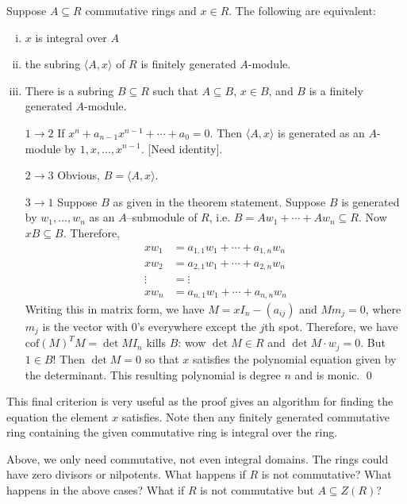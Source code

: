 \begin{thm}
Suppose $A \subseteq R$ commutative rings and $x \in R$. The following are equivalent:
\begin{enumerate}[(i)]
\item $x$ is integral over $A$
\item the subring $\langle A,x \rangle$ of $R$ is finitely generated $A$-module. 
\item There is a subring $B\subseteq R$ such that $A \subseteq B$, $x \in B$, and $B$ is a finitely generated $A$-module. 
\end{enumerate}
\end{thm}

\pf
\begin{enumerate}
\item[$1 \to 2$] If $x^n+a_{n-1}x^{n-1}+\cdots+a_0=0$. Then $\langle A,x\rangle$ is generated as an $A$-module by $1,x,\ldots,x^{n-1}$. [Need identity]. 
\item[$2 \to 3$] Obvious, $B=\langle A,x\rangle$.
\item[$3 \to 1$] Suppose $B$ as given in the theorem statement. Suppose $B$ is generated by $w_1,\ldots,w_n$ as an $A$--submodule of $R$, i.e. $B=Aw_1 + \cdots + A w_n \subseteq R$. Now $xB \subseteq B$. Therefore,
	\[
	\begin{split}
	xw_1&= a_{1,1}w_1 + \cdots + a_{1,n} w_n \\
	xw_2&=a_{2,1}w_1 + \cdots + a_{2,n} w_n \\
	       \vdots &= \vdots \\
	xw_n &= a_{n,1} w_1 + \cdots + a_{n,n} w_n      
	\end{split}
	\]
Writing this in matrix form, we have $M=xI_n - (a_{ij})$ and $M m_j=0$, where $m_j$ is the vector with 0's everywhere except the $j$th spot. Therefore, we have $\text{cof}(M)^T M=\det M I_n$ kills $B$: wow $\det M \in R$ and $\det M \cdot w_j =0$. But $1 \in B$! Then $\det M=0$ so that $x$ satisfies the polynomial equation given by the determinant. This resulting polynomial is degree $n$ and is monic. \qed \\
\end{enumerate}

\tb This final criterion is very useful as the proof gives an algorithm for finding the equation the element $x$ satisfies. Note then any finitely generated commutative ring containing the given commutative ring is integral over the ring. 

\tb Above, we only need commutative, not even integral domains. The rings could have zero divisors or nilpotents. What happens if $R$ is not commutative? What happens in the above cases? What if $R$ is not commutative but $A \subseteq Z(R)$?


